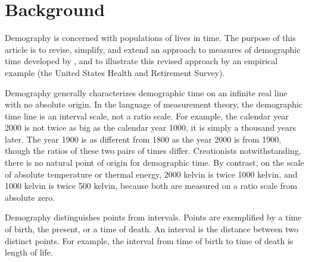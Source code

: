 \documentclass{bmcart}
\begin{document}


\section*{Background}
Demography is concerned with populations of lives in time. 
The purpose of this article is to revise, simplify, and extend
an approach to measures of demographic time developed by \citet{riffe2017demographictime},
and to illustrate this revised approach by an empirical 
example (the United States Health and Retirement Survey).


Demography generally characterizes
demographic time on an infinite real line with no absolute origin.
In the language of measurement theory, the demographic time line is an interval scale,
not a ratio scale.
For example, 
the calendar year 2000 is not twice as big as the calendar year 1000, it is simply a thousand years later.
The year 1900 is as different from 1800 as the year 2000 is from 1900, 
though the ratios of these two pairs of times differ.
Creationists notwithstanding, there is no natural point of origin for demographic time.
By contrast, on the scale of absolute temperature or thermal energy,
2000 kelvin is twice 1000 kelvin, 
and 1000 kelvin is twice 500 kelvin, 
because both are measured on a ratio scale from absolute zero.

Demography distinguishes points from intervals. 
Points are exemplified by a time of birth, the present, or a time of death.
An interval is the distance between two distinct points. 
For example, the interval from time of birth to time of death is length of life. 
\end{document}
